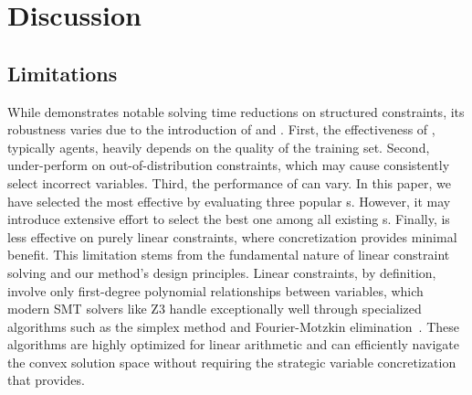 
\section{Discussion}
\label{sec:discussion}

\subsection{Limitations}
While \tool demonstrates notable solving time reductions on structured constraints, its robustness varies due to the introduction of \RL and \LLM. 
First, the effectiveness of \RL, typically \RL agents, heavily depends on the quality of the training set. 
Second, \tool under-perform on out-of-distribution constraints, which may cause \tool consistently select incorrect variables. 
Third, the performance of \LLM{} can vary. In this paper, we have selected the most effective \LLM by evaluating three popular \LLM{}s. However, it may introduce extensive effort to select the best one among all existing \LLM{}s. 
Finally, \tool is less effective on purely linear constraints, where concretization provides minimal benefit. This limitation stems from the fundamental nature of linear constraint solving and our method's design principles. Linear constraints, by definition, involve only first-degree polynomial relationships between variables, which modern SMT solvers like Z3 handle exceptionally well through specialized algorithms such as the simplex method and Fourier-Motzkin elimination~\cite{kroening2016decision}. These algorithms are highly optimized for linear arithmetic and can efficiently navigate the convex solution space without requiring the strategic variable concretization that \tool provides.

